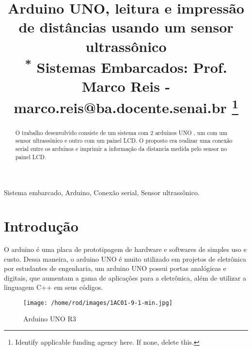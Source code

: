 \documentclass[conference]{IEEEtran}
\begin{document}
\title{Arduino UNO, leitura e impressão de distâncias usando um sensor ultrassônico\\
{\footnotesize \textsuperscript{*} Sistemas Embarcados: Prof. Marco Reis - marco.reis@ba.docente.senai.br}
\thanks{Identify applicable funding agency here. If none, delete this.}
}



\author{
}

\maketitle

\begin{abstract}
 O trabalho desenvolvido consiste de um sistema com 2 arduinos UNO
, um com um sensor ultrassônico e outro com um painel LCD. O proposto era 
realizar uma conexão serial entre os arduinos e imprimir a informação da distancia medida
pelo sensor no painel LCD.
\end{abstract}

\begin{IEEEkeywords}
Sistema embarcado, Arduino, Conexão serial, Sensor ultrassônico.
\end{IEEEkeywords}

\section{Introdução}
O arduino é uma placa de prototipagem de hardware e softwares de simples uso e custo. Dessa maneira, o arduino UNO é muito utilizado em projetos de eletrônica
por estudantes de engenharia, um arduino UNO possui portas analógicas e digitais, que aumentam a gama de aplicações para a eletrônica, além de utilizar
a linguagem C++ em seus códigos. 

\begin{figure}[htbp]
    \centerline{\texttt{[image: /home/rod/images/1AC01-9-1-min.jpg]}}
    \caption{Arduino UNO R3}
    \label{fig}
    \end{figure}
\end{document}
